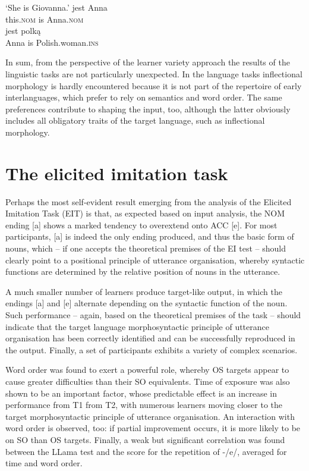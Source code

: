 \ea%
    \label{ex:08:8}
    \glt    ‘She is Giovanna.’
    \ex\label{ex:08:8b}
        {jest}  {Anna}\\
            this\textsc{.nom}  is  Anna\textsc{.nom}\\
    \ex\label{ex:08:8c}
      {jest}  {polką}\\
            Anna  is  Polish.woman\textsc{.ins}\\
    \z
\z

In sum, from the perspective of the learner variety approach the results of the linguistic tasks are not particularly unexpected. In the language tasks inflectional morphology is hardly encountered because it is not part of the repertoire of early interlanguages, which prefer to rely on semantics and word order. The same preferences contribute to shaping the input, too, although the latter obviously includes all obligatory traits of the target language, such as inflectional morphology. 

\section{The elicited imitation task}\label{sec:08:2}

Perhaps the most self-evident result emerging from the analysis of the Elicited Imitation Task (EIT) is that, as expected based on input analysis, the NOM ending [a] shows a marked tendency to overextend onto ACC [e]. For most participants, [a] is indeed the only ending produced, and thus the basic form of nouns, which – if one accepts the theoretical premises of the EI test – should clearly point to a positional principle of utterance organisation, whereby syntactic functions are determined by the relative position of nouns in the utterance.

A much smaller number of learners produce target-like output, in which the endings [a] and [e] alternate depending on the syntactic function of the noun. Such performance – again, based on the theoretical premises of the task – should indicate that the target language morphosyntactic principle of utterance organisation has been correctly identified and can be successfully reproduced in the output. Finally, a set of participants exhibits a variety of complex scenarios. 

Word order was found to exert a powerful role, whereby OS targets appear to cause greater difficulties than their SO equivalents. Time of exposure was also shown to be an important factor, whose predictable effect is an increase in performance from T1 from T2, with numerous learners moving closer to the target morphosyntactic principle of utterance organisation. An interaction with word order is observed, too: if partial improvement occurs, it is more likely to be on SO than OS targets. Finally, a weak but significant correlation was found between the LLama test and the score for the repetition of -/e/, averaged for time and word order.

